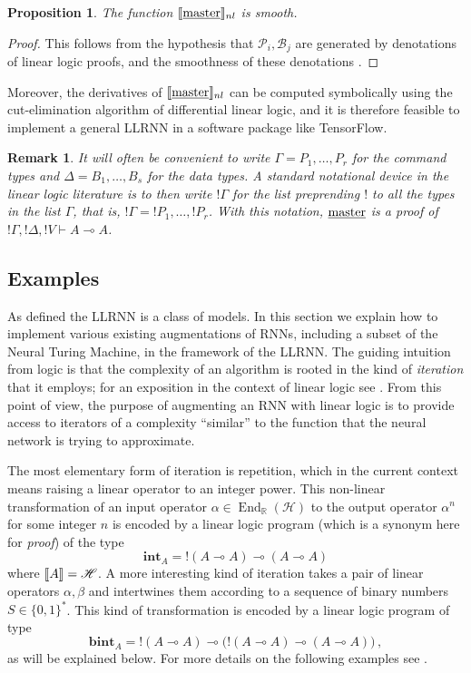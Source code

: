 \documentclass[english,letter paper,12pt,leqno]{article}
\newtheorem{proposition}[theorem]{Proposition}
\theoremstyle{example}
\newtheorem{remark}[theorem]{Remark}
\numberwithin{equation}{section}
\DeclareMathOperator{\End}{End}
\begin{document}
\begin{proposition} The function $\llbracket \underline{\textup{master}} \rrbracket_{nl}$ is smooth.
\end{proposition}
\begin{proof}
This follows from the hypothesis that $\mathscr{P}_i, \mathscr{B}_j$ are generated by denotations of linear logic proofs, and the smoothness of these denotations \cite{murfetclift}.
\end{proof}

Moreover, the derivatives of $\llbracket \underline{\textup{master}} \rrbracket_{nl}$ can be computed symbolically using the cut-elimination algorithm of differential linear logic, and it is therefore feasible to implement a general LLRNN in a software package like TensorFlow. 

\begin{remark}\label{remark:sequentbang} It will often be convenient to write $\Gamma = P_1, \ldots, P_r$ for the command types and $\Delta = B_1, \ldots, B_s$ for the data types. A standard notational device in the linear logic literature is to then write ${!} \Gamma$ for the list preprending ${!}$ to all the types in the list $\Gamma$, that is, ${!} \Gamma = {!} P_1, \ldots, {!} P_r$. With this notation, $\underline{\textup{master}}$ is a proof of ${!} \Gamma, {!} \Delta, {!} V \vdash A \multimap A$.
\end{remark}

\subsection{Examples}

As defined the LLRNN is a class of models. In this section we explain how to implement various existing augmentations of RNNs, including a subset of the Neural Turing Machine, in the framework of the LLRNN. The guiding intuition from logic is that the complexity of an algorithm is rooted in the kind of \emph{iteration} that it employs; for an exposition in the context of linear logic see \cite[\S 7]{murfet_ll}. From this point of view, the purpose of augmenting an RNN with linear logic is to provide access to iterators of a complexity ``similar'' to the function that the neural network is trying to approximate.

The most elementary form of iteration is repetition, which in the current context means raising a linear operator to an integer power. This non-linear transformation of an input operator $\alpha \in \End_{\mathbb{R}}(\mathscr{H})$ to the output operator $\alpha^n$ for some integer $n$ is encoded by a linear logic program (which is a synonym here for \emph{proof}) of the type
\[
\textbf{int}_A = {!}(A \multimap A) \multimap (A \multimap A)
\]
where $\llbracket A \rrbracket = \mathscr{H}$. A more interesting kind of iteration takes a pair of linear operators $\alpha, \beta$ and intertwines them according to a sequence of binary numbers $S \in \{0,1\}^*$. This kind of transformation is encoded by a linear logic program of type
\[
\textbf{bint}_A = {!}(A \multimap A) \multimap \big({!}(A \multimap A) \multimap (A \multimap A)\big)\,,
\]
as will be explained below. For more details on the following examples see \cite[\S 3]{murfetclift}. 
\end{document}
